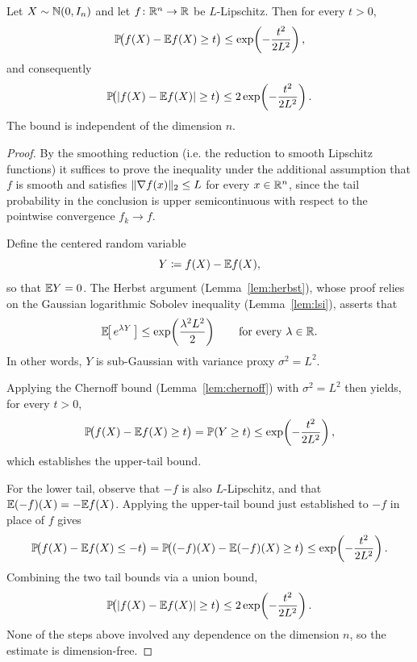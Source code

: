 \begin{theorem}
\label{thm:main}
Let $X \sim \mathbb{N}(0, I_n)$ and let $f \colon \mathbb{R}^n \to \mathbb{R}$ be $L$-Lipschitz. Then for
every $t > 0$,
\[
    \mathbb{P}\!\bigl( f(X) - \mathbb{E} f(X) \ge t \bigr) \le \exp\!\left( -\frac{t^2}{2L^2} \right) ,
\]
and consequently
\[
    \mathbb{P}\!\bigl( |{f(X) - \mathbb{E} f(X)}|\ge t \bigr) \le 2\exp\!\left( -\frac{t^2}{2L^2} \right) .
\]
The bound is independent of the dimension $n$.
\end{theorem}

\begin{proof}
By the smoothing reduction (i.e. the reduction to smooth Lipschitz functions) it suffices to prove the
inequality under the additional assumption that $f$ is smooth and satisfies
$\Vert \nabla f(x) \Vert_2 \le L$ for every $x \in \mathbb{R}^n$, since the tail probability
in the conclusion is upper semicontinuous with respect to the pointwise
convergence $f_k \to f$.

Define the centered random variable
\[
    Y \coloneqq f(X) - \mathbb{E} f(X) ,
\]
so that $\mathbb{E} Y = 0$. The Herbst argument (Lemma~\ref{lem:herbst}), whose proof
relies on the Gaussian logarithmic Sobolev inequality (Lemma~\ref{lem:lsi}),
asserts that
\[
    \mathbb{E}\!\bigl[\, e^{\lambda Y} \,\bigr] \le \exp\!\left( \frac{\lambda^2 L^2}{2} \right)
    \qquad \text{for every } \lambda \in \mathbb{R} .
\]
In other words, $Y$ is sub-Gaussian with variance proxy $\sigma^2 = L^2$.

Applying the Chernoff bound (Lemma~\ref{lem:chernoff}) with $\sigma^2 = L^2$ then
yields, for every $t > 0$,
\[
    \mathbb{P}\!\bigl( f(X) - \mathbb{E} f(X) \ge t \bigr) = \mathbb{P}(Y \ge t) \le \exp\!\left( -\frac{t^2}{2L^2} \right) ,
\]
which establishes the upper-tail bound.

For the lower tail, observe that $-f$ is also $L$-Lipschitz, and that
$\mathbb{E}(-f)(X) = -\mathbb{E} f(X)$. Applying the upper-tail bound just established to $-f$ in
place of $f$ gives
\[
    \mathbb{P}\!\bigl( f(X) - \mathbb{E} f(X) \le -t \bigr)
    = \mathbb{P}\!\bigl( (-f)(X) - \mathbb{E}(-f)(X) \ge t \bigr)
    \le \exp\!\left( -\frac{t^2}{2L^2} \right) .
\]
Combining the two tail bounds via a union bound,
\[
    \mathbb{P}\!\bigl( |f(X) - \mathbb{E} f(X)| \ge t \bigr) \le 2\exp\!\left( -\frac{t^2}{2L^2} \right) .
\]
None of the steps above involved any dependence on the dimension $n$, so the
estimate is dimension-free.
\end{proof}
